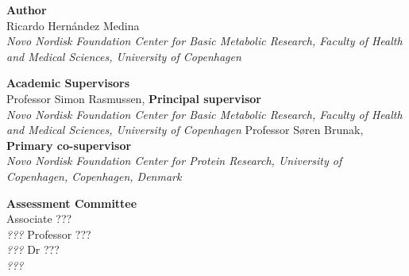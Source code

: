 \noindent
\textbf{Author}\\
\noindent Ricardo Hernández Medina\\
\textit{Novo Nordisk Foundation Center for Basic Metabolic Research, Faculty of Health and Medical Sciences, University of Copenhagen}\\
\newline
\newline

\noindent \textbf{Academic Supervisors}\\
Professor Simon Rasmussen, \textbf{Principal supervisor}\\
\textit{Novo Nordisk Foundation Center for Basic Metabolic Research, Faculty of Health and Medical Sciences, University of Copenhagen}
\newline
\newline
Professor Søren Brunak, \textbf{Primary co-supervisor}\\
\textit{Novo Nordisk Foundation Center for Protein Research, University of Copenhagen, Copenhagen, Denmark}

\noindent \newline  \newline \textbf{Assessment Committee}\\
Associate ???\\
\textit{???}
\newline
\newline
Professor ???\\
\textit{???}
\newline
\newline
Dr ???\\
\textit{???}